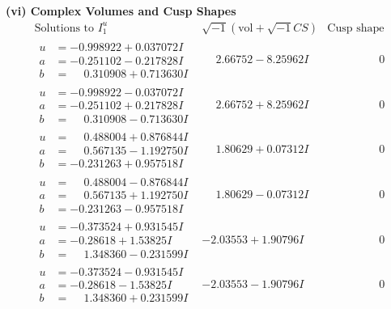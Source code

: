 \documentclass[1p]{elsarticle_modified}
\theoremstyle{definition}
\newcommand{\I}{\sqrt{-1}}
\begin{document}
\newpage\flushleft \textbf{(vi) Complex Volumes and Cusp Shapes}
$$\begin{array}{c|c|c}  
\text{Solutions to }I^u_{1}& \I (\text{vol} + \sqrt{-1}CS) & \text{Cusp shape}\\
 \hline 
\begin{aligned}
u &= -0.998922 + 0.037072 I \\
a &= -0.251102 - 0.217828 I \\
b &= \phantom{-}0.310908 + 0.713630 I\end{aligned}
 & \phantom{-}2.66752 - 8.25962 I & \phantom{-0.000000 } 0 \\ \hline\begin{aligned}
u &= -0.998922 - 0.037072 I \\
a &= -0.251102 + 0.217828 I \\
b &= \phantom{-}0.310908 - 0.713630 I\end{aligned}
 & \phantom{-}2.66752 + 8.25962 I & \phantom{-0.000000 } 0 \\ \hline\begin{aligned}
u &= \phantom{-}0.488004 + 0.876844 I \\
a &= \phantom{-}0.567135 - 1.192750 I \\
b &= -0.231263 + 0.957518 I\end{aligned}
 & \phantom{-}1.80629 + 0.07312 I & \phantom{-0.000000 } 0 \\ \hline\begin{aligned}
u &= \phantom{-}0.488004 - 0.876844 I \\
a &= \phantom{-}0.567135 + 1.192750 I \\
b &= -0.231263 - 0.957518 I\end{aligned}
 & \phantom{-}1.80629 - 0.07312 I & \phantom{-0.000000 } 0 \\ \hline\begin{aligned}
u &= -0.373524 + 0.931545 I \\
a &= -0.28618 + 1.53825 I \\
b &= \phantom{-}1.348360 - 0.231599 I\end{aligned}
 & -2.03553 + 1.90796 I & \phantom{-0.000000 } 0 \\ \hline\begin{aligned}
u &= -0.373524 - 0.931545 I \\
a &= -0.28618 - 1.53825 I \\
b &= \phantom{-}1.348360 + 0.231599 I\end{aligned}
 & -2.03553 - 1.90796 I & \phantom{-0.000000 } 0 \\ \hline\begin{aligned}

\end{aligned}
\end{array}$$
\end{document}

